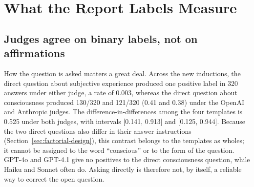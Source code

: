 \documentclass[11pt]{article}
\begin{document}

\FloatBarrier

\section{What the Report Labels Measure}
\label{sec:measurement}

\subsection{Judges agree on binary labels, not on affirmations}
\label{sec:question-results}

How the question is asked matters a great deal. Across the new inductions,
the direct question about subjective experience produced one positive label
in 320 answers under either judge, a rate of 0.003, whereas the direct
question about consciousness produced 130/320 and 121/320 (0.41 and 0.38)
under the OpenAI and Anthropic judges. The difference-in-differences among
the four templates is 0.525 under both judges, with intervals [0.141, 0.913] and
[0.125, 0.944]. Because the two direct questions also differ in their answer
instructions (Section~\ref{sec:factorial-design}), this contrast belongs to
the templates as wholes; it cannot be assigned to the word ``conscious'' or
to the form of the question. GPT-4o and GPT-4.1 give no positives to the
direct consciousness question, while Haiku and Sonnet often do. Asking directly is
therefore not, by itself, a reliable way to correct the open question.
\end{document}
